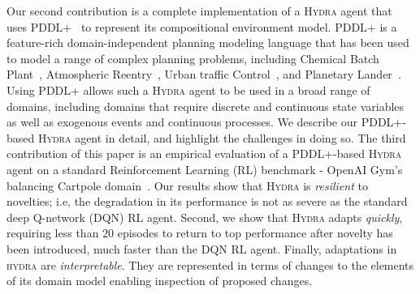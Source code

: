 \documentclass[letterpaper]{article} %
\newcommand{\hydra}{\textsc{Hydra}\xspace} %
\begin{document}
Our second contribution is a complete implementation of a \hydra agent that uses PDDL+~\cite{fox2006modelling} to represent its compositional environment model. %
PDDL+ is a feature-rich domain-independent planning modeling language that has been used to model a range of complex planning problems, including Chemical Batch Plant~\cite{della2010pddl+}, Atmospheric Reentry~\cite{piotrowski2018heuristics}, Urban traffic Control~\cite{vallati2016efficient}, and Planetary Lander~\cite{della2010resource}. 
Using PDDL+ allows such a \hydra agent to be used in a broad range of domains, including domains that require discrete and continuous state variables as well as exogenous events and continuous processes. 
We describe our PDDL+-based \hydra agent in detail, and highlight the challenges in doing so. 
The third contribution of this paper is an empirical evaluation of a PDDL+-based \hydra agent on a standard Reinforcement Learning (RL) benchmark - OpenAI Gym's balancing Cartpole domain~\cite{barto1983neuronlike,brockman2016openai}. Our results show that \hydra is \emph{resilient} to novelties; i.e, the degradation in its performance is not as severe as the standard deep Q-network (DQN) RL agent. Second, we show that \hydra adapts \emph{quickly}, requiring less than $20$ episodes to return to top performance after novelty has been introduced, much faster than the DQN RL agent. Finally, adaptations in \textsc{hydra} are \emph{interpretable}. They are represented in terms of changes to the elements of its domain model enabling inspection of proposed changes.



\end{document}
